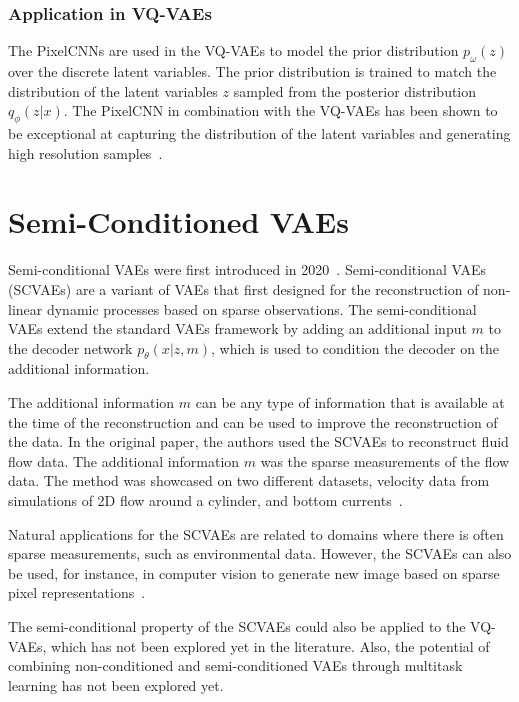 \subsubsection{Application in VQ-VAEs}

The PixelCNNs are used in the VQ-VAEs to model the prior distribution $p_{\omega}(z)$ over the discrete latent variables. The prior distribution is trained to match the distribution of the latent variables $z$ sampled from the posterior distribution $q_{\phi}(z|x)$. The PixelCNN in combination with the VQ-VAEs has been shown to be exceptional at capturing the distribution of the latent variables and generating high resolution samples~\cite{vqvae}.

\section{Semi-Conditioned VAEs}

Semi-conditional VAEs were first introduced in 2020~\cite{Gundersen_2021}. Semi-conditional VAEs (SCVAEs) are a variant of VAEs that first designed for the reconstruction of non-linear dynamic processes based on sparse observations. The semi-conditional VAEs extend the standard VAEs framework by adding an additional input $m$ to the decoder network $p_{\theta}(x|z, m)$, which is used to condition the decoder on the additional information. 

The additional information $m$ can be any type of information that is available at the time of the reconstruction and can be used to improve the reconstruction of the data. In the original paper, the authors used the SCVAEs to reconstruct fluid flow data. The additional information $m$ was the sparse measurements of the flow data. The method was showcased on two different datasets, velocity data from simulations of 2D flow around a cylinder, and bottom currents~\cite{Gundersen_2021}.

Natural applications for the SCVAEs are related to domains where there is often sparse measurements, such as environmental data. However, the SCVAEs can also be used, for instance, in computer vision to generate new image based on sparse pixel representations~\cite{Gundersen_2021}.

The semi-conditional property of the SCVAEs could also be applied to the VQ-VAEs, which has not been explored yet in the literature. Also, the potential of combining non-conditioned and semi-conditioned VAEs through multitask learning has not been explored yet.

